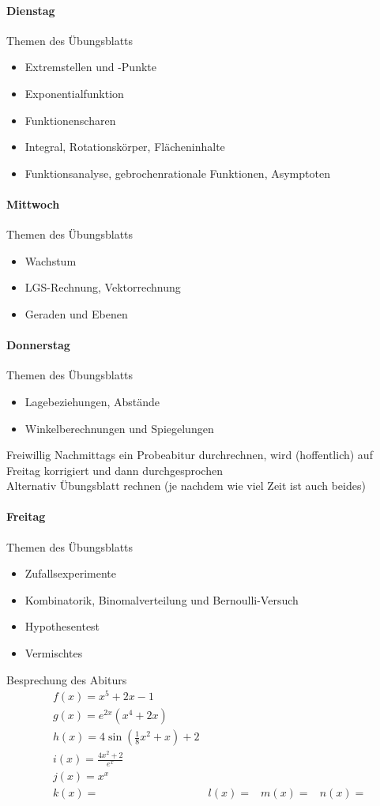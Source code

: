 \documentclass[a4paper, oneside]{article}
\begin{document}
		\paragraph{Dienstag}
		Themen des Übungsblatts \begin{itemize}
			\item Extremstellen und -Punkte
			\item Exponentialfunktion
			\item Funktionenscharen
			\item Integral, Rotationskörper, Flächeninhalte
			\item Funktionsanalyse, gebrochenrationale Funktionen, Asymptoten
		\end{itemize}

		\paragraph{Mittwoch}
		Themen des Übungsblatts \begin{itemize}
			\item Wachstum
			\item LGS-Rechnung, Vektorrechnung
			\item Geraden und Ebenen
		\end{itemize}

		\paragraph{Donnerstag}
		Themen des Übungsblatts \begin{itemize}
			\item Lagebeziehungen, Abstände
			\item Winkelberechnungen und Spiegelungen
		\end{itemize}
		Freiwillig Nachmittags ein Probeabitur durchrechnen, wird (hoffentlich) auf Freitag korrigiert und dann durchgesprochen\\
		Alternativ Übungsblatt rechnen (je nachdem wie viel Zeit ist auch beides)\\

\clearpage
		\paragraph{Freitag}
		Themen des Übungsblatts \begin{itemize}
			\item Zufallsexperimente
			\item Kombinatorik, Binomalverteilung und Bernoulli-Versuch
			\item Hypothesentest
			\item Vermischtes
		\end{itemize}
		 Besprechung des Abiturs\\


\clearpage
\begin{align*}
	&f(x)=x^5+2x-1\\
	&g(x)=e^{2x}(x^4+2x)\\
	&h(x)=4\sin\left(\frac 1 8x^2+x\right)+2\\
	&i(x)=\frac{4x^2+2}{e^x}\\
	&j(x)=x^x\\
	&k(x)=
	&l(x)=
	&m(x)=
	&n(x)=
\end{align*}
\end{document}
